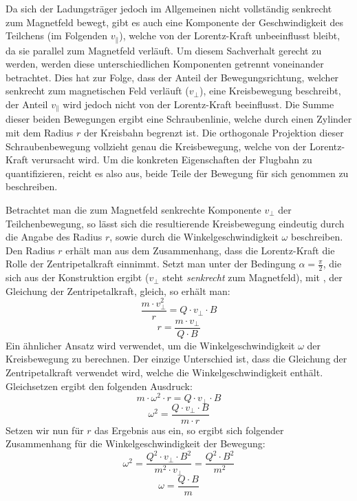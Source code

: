 Da sich der Ladungstr\"ager jedoch im Allgemeinen nicht vollst\"andig senkrecht zum Magnetfeld bewegt, gibt es auch eine Komponente
der Geschwindigkeit des Teilchens (im Folgenden \(v_\parallel\)), welche von der Lorentz-Kraft unbeeinflusst bleibt, da sie parallel zum
Magnetfeld verl\"auft.
Um diesem Sachverhalt gerecht zu werden, werden diese unterschiedlichen Komponenten getrennt voneinander betrachtet. Dies hat zur
Folge, dass der Anteil der Bewegungsrichtung, welcher senkrecht zum magnetischen Feld verl\"auft (\(v_\perp\)), eine Kreisbewegung
beschreibt,
der Anteil \(v_\parallel\) wird jedoch nicht von der Lorentz-Kraft beeinflusst. 
Die Summe dieser beiden Bewegungen ergibt
eine Schraubenlinie, welche durch einen Zylinder mit dem Radius \(r\) der Kreisbahn begrenzt ist. Die orthogonale Projektion dieser
Schraubenbewegung vollzieht genau die Kreisbewegung, welche von der Lorentz-Kraft verursacht wird.
Um die konkreten Eigenschaften der Flugbahn zu quantifizieren, reicht es also aus, beide Teile der Bewegung f\"ur sich genommen
zu beschreiben. 

Betrachtet man die zum Magnetfeld senkrechte Komponente \(v_\perp\) der Teilchenbewegung, so l\"asst sich die resultierende Kreisbewegung
eindeutig durch die Angabe des Radius \(r\), sowie durch die Winkelgeschwindigkeit \(\omega\) beschreiben. Den Radius \(r\) erh\"alt
man aus dem Zusammenhang, dass die Lorentz-Kraft die Rolle der Zentripetalkraft einnimmt. Setzt man  unter der
Bedingung \(\alpha = \frac{\pi}{2}\), die sich aus der Konstruktion ergibt (\(v_\perp\) steht \textit{senkrecht} zum Magnetfeld),
mit , der Gleichung der Zentripetalkraft, gleich, so erh\"alt man:
\begin{equation*}
  \frac{m \cdot v_\perp^2}{r} = Q \cdot v_\perp \cdot B
\end{equation*}
\begin{equation}
  \label{eq:radius}
  r = \frac{m \cdot v_\perp}{Q \cdot B}
\end{equation}
Ein \"ahnlicher Ansatz wird verwendet, um die Winkelgeschwindigkeit \(\omega\) der Kreisbewegung zu berechnen. Der einzige Unterschied
ist, dass die Gleichung der Zentripetalkraft verwendet wird, welche die Winkelgeschwindigkeit enth\"alt. Gleichsetzen ergibt den
folgenden Ausdruck:
\begin{equation*}
  m \cdot \omega^2 \cdot r = Q \cdot v_\perp \cdot B
\end{equation*}
\begin{equation*}
  \omega^2 = \frac{Q \cdot v_\perp \cdot B}{m \cdot r}
\end{equation*}
Setzen wir nun f\"ur \(r\) das Ergebnis aus  ein, so ergibt sich folgender Zusammenhang f\"ur die
Winkelgeschwindigkeit der Bewegung:
\begin{equation*}
  \omega^2 = \frac{Q^2 \cdot v_\perp \cdot B^2}{m^2 \cdot v_\perp} = \frac{Q^2 \cdot B^2}{m^2}
\end{equation*}
\begin{equation}
  \omega = \frac{Q \cdot B}{m}
\end{equation}


